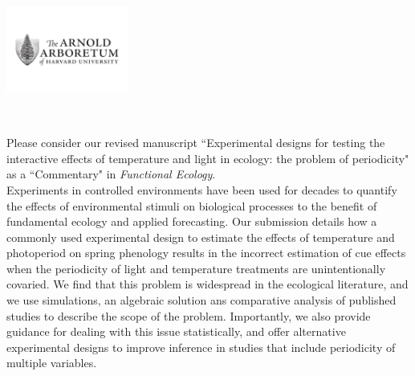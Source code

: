 \documentclass[11 pt]{article}
\begin{document}

\def\labelitemi{--}
\parindent=24pt
\noindent\includegraphics[width=0.3\textwidth]{AA_logo.jpg}

\\
\vspace{1.5ex}

\noindent Please consider our revised manuscript ``Experimental designs for testing the interactive effects of temperature and light in ecology: the problem of periodicity" as a ``Commentary" in \textit{Functional Ecology}.\\

\noindent Experiments in controlled environments have been used for decades to quantify the effects of environmental stimuli on biological processes to the benefit of fundamental ecology and applied forecasting. %
Our submission details how a commonly used experimental design to estimate the effects of temperature and photoperiod on spring phenology results in the incorrect estimation of cue effects when the periodicity of light and temperature treatments are unintentionally covaried. We find that this problem is widespread in the ecological literature, and we use simulations, an algebraic solution ans comparative analysis of published studies to describe the scope of the problem. Importantly, we also provide guidance for dealing with this issue statistically, and offer alternative experimental designs to improve inference in studies that include periodicity of multiple variables.\\
\end{document}
